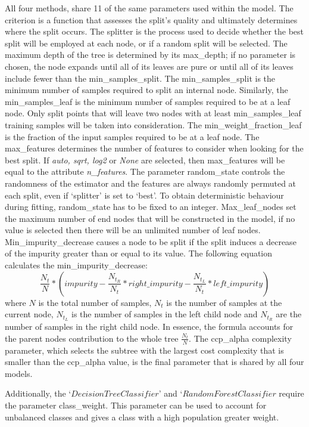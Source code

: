 \documentclass[../thesis.tex]{subfiles}
\begin{document}
All four methods, share 11 of the same parameters used within the model. The criterion is a function that assesses the split's quality and ultimately determines where the split occurs. The splitter is the process used to decide whether the best split will be employed at each node, or if a random split will be selected. The maximum depth of the tree is determined by its max\_depth; if no parameter is chosen, the node expands until all of its leaves are pure or until all of its leaves include fewer than the min\_samples\_split. The min\_samples\_split is the minimum number of samples required to split an internal node. Similarly, the min\_samples\_leaf is the minimum number of samples required to be at a leaf node. Only split points that will leave two nodes with at least min\_samples\_leaf training samples will be taken into consideration. The min\_weight\_fraction\_leaf is the fraction of the input samples required to be at a leaf node. The max\_features determines the number of features to consider when looking for the best split. If \textit{auto, sqrt, log2} or \textit{None} are selected, then max\_features will be equal to the attribute \textit{n\_features}. The parameter random\_state controls the randomness of the estimator and the features are always randomly permuted at each split, even if `splitter' is set to `best'. To obtain deterministic behaviour during fitting, random\_state has to be fixed to an integer. Max\_leaf\_nodes set the maximum number of end nodes that will be constructed in the model, if no value is selected then there will be an unlimited number of leaf nodes. Min\_impurity\_decrease causes a node to be split if the split induces a decrease of the impurity greater than or equal to its value. The following equation calculates the min\_impurity\_decrease:
\begin{equation}
    \frac{N_t}{N} * (impurity - \frac{N_{t_R}}{N_t} * right\_impurity -\frac{N_{t_L}}{N_t} * left\_impurity)
\end{equation}
where $N$ is the total number of samples, $N_t$ is the number of samples at the current node, $N_{t_L}$ is the number of samples in the left child node and $N_{t_R}$ are the number of samples in the right child node. In essence, the formula accounts for the parent nodes contribution to the whole tree $\frac{N_t}{N}$. The ccp\_alpha complexity parameter, which selects the subtree with the largest cost complexity that is smaller than the ccp\_alpha value, is the final parameter that is shared by all four models.

Additionally, the `$DecisionTreeClassifier$' and `$RandomForestClassifier$ require the parameter class\_weight. This parameter can be used to account for unbalanced classes and gives a class with a high population greater weight.
\end{document}
